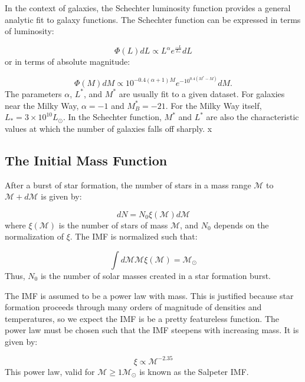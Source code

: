 In the context of galaxies, the Schechter luminosity function provides a general analytic fit to galaxy functions. The Schechter function can be expressed in terms of luminosity:

\begin{equation}
\Phi(L) dL \propto L^\alpha  e^{\frac{-L}{L_*}} dL
\end{equation}
or in terms of absolute magnitude:

\begin{equation}
\Phi(M) dM \propto 10^{-0.4(\alpha+1)M} e^{-10^{0.4(M^*-M)}} dM.
 \end{equation}
 The parameters $\alpha$, $L^*$, and $M^*$ are usually fit to a given dataset. For galaxies near the Milky Way, $\alpha = -1$ and $M^*_B = -21$. For the Milky Way itself, $L_* = 3\times 10^{10} L_\odot$. In the Schechter function, $M^*$ and $L^*$ are also the characteristic values at which the number of galaxies falls off sharply. x 

\subsection{The Initial Mass Function}

After a burst of star formation, the number of stars in a mass range $\mathcal{M}$ to $\mathcal{M}+d\mathcal{M}$ is given by:

\begin{equation}
dN = N_0 \xi(\mathcal{M}) d\mathcal{M}
\end{equation}
where $\xi(\mathcal{M})$ is the number of stars of mass $\mathcal{M}$, and $N_0$ depends on the normalization of $\xi$. The IMF is normalized such that:

\begin{equation}
\int d\mathcal{M} \mathcal{M} \xi(\mathcal{M}) = \mathcal{M}_\odot
\end{equation}
Thus, $N_0$ is the number of solar masses created in a star formation burst. 

The IMF is assumed to be a power law with mass. This is justified because star formation proceeds through many orders of magnitude of densities and temperatures, so we expect the IMF is be a pretty featureless function. The power law must be chosen such that the IMF steepens with increasing mass. It is given by:

\begin{equation}
\xi  \propto \mathcal{M}^{-2.35}
\end{equation}
This power law, valid for $\mathcal{M} \geq 1\mathcal{M}_\odot$ is known as the Salpeter IMF.

